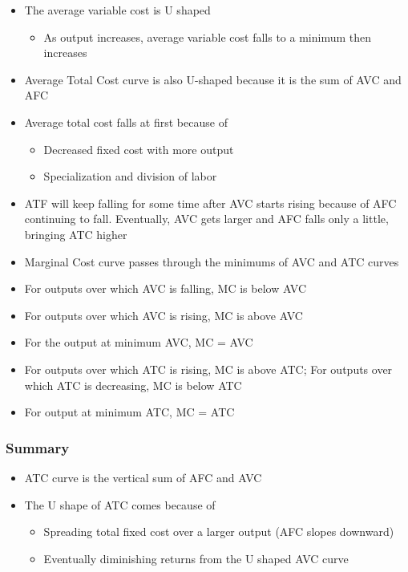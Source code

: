 \documentclass[11pt]{article}
\begin{document}
\begin{itemize}
\item The average variable cost is U shaped
\begin{itemize}
\item As output increases, average variable cost falls to a minimum then increases
\end{itemize}
\item Average Total Cost curve is also U-shaped because it is the sum of AVC and AFC
\item Average total cost falls at first because of
\begin{itemize}
\item Decreased fixed cost with more output
\item Specialization and division of labor
\end{itemize}
\item ATF will keep falling for some time after AVC starts rising because of AFC continuing to fall. Eventually, AVC gets larger and AFC falls only a little, bringing ATC higher
\item Marginal Cost curve passes through the minimums of AVC and ATC curves
\item For outputs over which AVC is falling, MC is below AVC
\item For outputs over which AVC is rising, MC is above AVC
\item For the output at minimum AVC, MC = AVC
\item For outputs over which ATC is rising, MC is above ATC; For outputs over which ATC is decreasing, MC is below ATC
\item For output at minimum ATC, MC = ATC
\end{itemize}
\subsubsection{Summary}
\label{sec:orgef1e93e}
\begin{itemize}
\item ATC curve is the vertical sum of AFC and AVC
\item The U shape of ATC comes because of
\begin{itemize}
\item Spreading total fixed cost over a larger output (AFC slopes downward)
\item Eventually diminishing returns from the U shaped AVC curve
\end{itemize}
\end{itemize}
\end{document}
